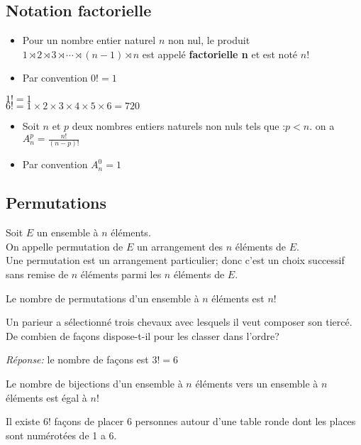 \subsection*{Notation factorielle}
\begin{itemize}
\item  Pour un nombre  entier naturel $ n $ non nul, le produit $ 1\rtimes 2\rtimes 3\rtimes \cdots \rtimes (n-1)\rtimes n  $ est appelé \textbf{factorielle n} et est noté $n!$\\
\item  Par convention $ 0!=1 $
\end{itemize}
\begin{example}
$1!=1$\\
$6!=1\times 2\times 3\times 4\times 5 \times 6= 720$
\end{example}
\begin{property}
\begin{itemize}
\item  Soit $ n$ et $p $ deux  nombres  entiers naturels  non nuls tels que :$ p< n $. on a  $A_{n}^{p}= \frac{n!}{(n-p)!} $
\item  Par convention $ A_{n}^{0}=1 $
\end{itemize}
\end{property}
\subsection{Permutations}
\begin{definition}
Soit $ E $ un ensemble à $ n $ éléments.\\
On appelle permutation de $ E $ un arrangement des $ n $ éléments de $ E. $\\
Une permutation est un arrangement particulier; donc c'est un choix successif sans remise de $ n $ éléments  parmi les $ n $ éléments de $ E. $
\end{definition}
\begin{property}
Le nombre de permutations d'un ensemble à $ n $ éléments est $ n! $
\end{property}
 \begin{example}
 Un parieur a sélectionné trois chevaux avec lesquels il veut composer son tiercé. De combien de façons  dispose-t-il pour les classer dans l'ordre? 
  \end{example}
 \textit{Réponse:}  le nombre de façons est $ 3!= 6 $
	
\begin{property}
 Le nombre de bijections  d'un ensemble à $ n $ éléments vers un ensemble à $ n $ éléments est égal à $ n! $
 \end{property}
 \begin{example}
 Il existe $ 6! $ façons de placer 6 personnes autour d'une table ronde  dont les places sont numérotées de 1 a 6.	
 \end{example}
 
